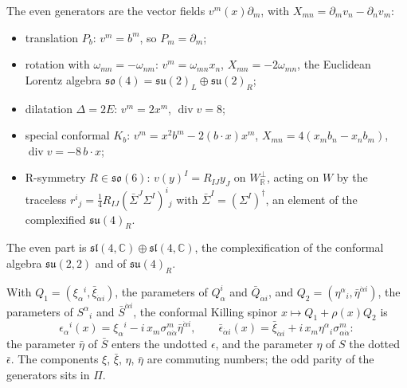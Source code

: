 \begin{remark}
The even generators are the vector fields $v^m(x)\partial_m$, with $X_{mn}=\partial_mv_n-\partial_nv_m$:
\begin{itemize}
\item translation $P_b$: $v^m=b^m$, so $P_m=\partial_m$;
\item rotation with $\omega_{mn}=-\omega_{nm}$: $v^m=\omega_{mn}x_n$, $X_{mn}=-2\omega_{mn}$, the Euclidean Lorentz algebra $\mathfrak{so}(4)=\mathfrak{su}(2)_L\oplus\mathfrak{su}(2)_R$;
\item dilatation $\Delta=2E$: $v^m=2x^m$, $\operatorname{div}v=8$;
\item special conformal $K_b$: $v^m=x^2b^m-2(b\cdot x)x^m$, $X_{mn}=4(x_mb_n-x_nb_m)$, $\operatorname{div}v=-8\,b\cdot x$;
\item R-symmetry $R\in\mathfrak{so}(6)$: $v(y)^I=R_{IJ}y_J$ on $W_{\mathbb R}^\perp$, acting on $W$ by the traceless $r^i{}_j=\tfrac14R_{IJ}(\bar\Sigma^J\Sigma^I)^i{}_j$ with $\bar\Sigma^I=(\Sigma^I)^\dagger$, an element of the complexified $\mathfrak{su}(4)_R$.
\end{itemize}
The even part is $\mathfrak{sl}(4,\mathbb C)\oplus\mathfrak{sl}(4,\mathbb C)$, the complexification of the conformal algebra $\mathfrak{su}(2,2)$ and of $\mathfrak{su}(4)_R$.
\end{remark}

\begin{remark}
With $Q_1=(\xi_\alpha{}^i,\bar\xi_{\dot\alpha i})$, the parameters of $Q^i_\alpha$ and $\bar Q_{\dot\alpha i}$, and $Q_2=(\eta^\alpha{}_i,\bar\eta^{\dot\alpha i})$, the parameters of $S^\alpha{}_i$ and $\bar S^{\dot\alpha i}$, the conformal Killing spinor $x\mapsto Q_1+\rho(x)Q_2$ is
\[
\epsilon_\alpha{}^i(x)=\xi_\alpha{}^i-i\,x_m\sigma^m_{\alpha\dot\alpha}\bar\eta^{\dot\alpha i},\qquad \bar\epsilon_{\dot\alpha i}(x)=\bar\xi_{\dot\alpha i}+i\,x_m\eta^\alpha{}_i\sigma^m_{\alpha\dot\alpha}:
\]
the parameter $\bar\eta$ of $\bar S$ enters the undotted $\epsilon$, and the parameter $\eta$ of $S$ the dotted $\bar\epsilon$. The components $\xi$, $\bar\xi$, $\eta$, $\bar\eta$ are commuting numbers; the odd parity of the generators sits in $\Pi$.
\end{remark}

